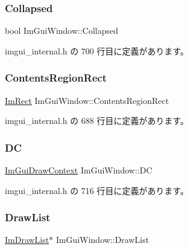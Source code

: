 \subsubsection{\texorpdfstring{Collapsed}{Collapsed}}
{\footnotesize\ttfamily bool Im\+Gui\+Window\+::\+Collapsed}



 imgui\+\_\+internal.\+h の 700 行目に定義があります。

\mbox{\label{struct_im_gui_window_ac0d04b743eab132900c1ededc8eab9f6}} 
\subsubsection{\texorpdfstring{Contents\+Region\+Rect}{ContentsRegionRect}}
{\footnotesize\ttfamily \mbox{\hyperlink{struct_im_rect}{Im\+Rect}} Im\+Gui\+Window\+::\+Contents\+Region\+Rect}



 imgui\+\_\+internal.\+h の 688 行目に定義があります。

\mbox{\label{struct_im_gui_window_a3a20c68996093058481ae8e174258a04}} 
\subsubsection{\texorpdfstring{DC}{DC}}
{\footnotesize\ttfamily \mbox{\hyperlink{struct_im_gui_draw_context}{Im\+Gui\+Draw\+Context}} Im\+Gui\+Window\+::\+DC}



 imgui\+\_\+internal.\+h の 716 行目に定義があります。

\mbox{\label{struct_im_gui_window_a39de4668b09754136c6fd7ab89ab674a}} 
\subsubsection{\texorpdfstring{Draw\+List}{DrawList}}
{\footnotesize\ttfamily \mbox{\hyperlink{struct_im_draw_list}{Im\+Draw\+List}}$\ast$ Im\+Gui\+Window\+::\+Draw\+List}



